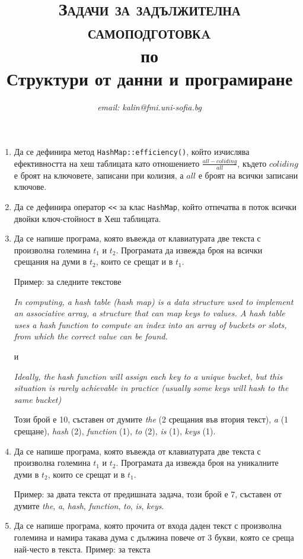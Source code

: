 \documentclass[12pt,a4paper]{article}
\author{\textit{email: kalin@fmi.uni-sofia.bg}}
\title{\textsc{Задачи за задължителна самоподготовкa} \\
по \\
Структури от данни и програмиране}
\begin{document}
\maketitle


\begin{enumerate}

	\item Да се дефинира метод \texttt{HashMap::efficiency()}, който изчислява ефективността на хеш таблицата като отношението  $\frac{all-coliding}{all}$, където $coliding$ е броят на ключовете, записани при колизия, а $all$ е броят на всички записани ключове.


	\item Да се дефинира оператор \texttt{<}\texttt{<} за клас \texttt{HashMap}, който отпечатва в поток всички двойки ключ-стойност в Хеш таблицата.

	\item Да се напише програма, която въвежда от клавиатурата две текста с произволна големина $t_1$ и $t_2$. Програмата да извежда броя на всички срещания на думи в $t_2$, които се срещат и в $t_1$.

	Пример: за следните текстове

	\textit{In computing, a hash table (hash map) is a data structure used to implement an associative array, a structure that can map keys to values. A hash table uses a hash function to compute an index into an array of buckets or slots, from which the correct value can be found.}

	и

	\textit{Ideally, the hash function will assign each key to a unique bucket, but this situation is rarely achievable in practice (usually some keys will hash to the same bucket)}

	Този брой е 10, съставен от думите \textit {the} (2 срещания във втория текст), \textit{a} (1 срещане), \textit{hash} (2), \textit {function} (1), \textit{to} (2), \textit{is} (1), \textit{keys} (1).


	\item Да се напише програма, която въвежда от клавиатурата две текста с произволна големина $t_1$ и $t_2$. Програмата да извежда броя на уникалните думи в $t_2$, които се срещат и в $t_1$.

	Пример: за двата текста от предишната задача, този брой е 7, съставен от думите \textit {the}, \textit{a}, \textit{hash}, \textit {function}, \textit{to}, \textit{is}, \textit{keys}.


	\item Да се напише програма, която прочита от входа даден текст с произволна големина и намира такава дума с дължина повече от 3 букви, която се среща най-често в текста. Пример: за текста


\end{enumerate}
\end{document}
